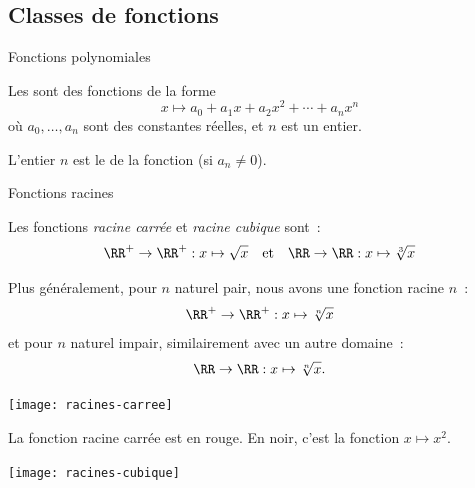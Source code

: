 \documentclass[french,xcolor=svgnames]{beamer}
\begin{document}
\subsection{Classes de fonctions}
\begin{frame}{Fonctions polynomiales}
  \begin{definition}
    Les \pause{} sont des fonctions de la forme
    \begin{equation*}
      x \mapsto a_0 + a_1 x + a_2 x^2 + \cdots + a_n x^n
    \end{equation*}\pause{}
    où $a_0, \ldots, a_n$ sont des constantes réelles\pause{}, et $n$ est un entier.\pause

    L'entier \(n\) est le  de la fonction (si $a_n \neq 0$).
  \end{definition}\pause
\end{frame}

\begin{frame}{Fonctions racines}
  \begin{example}
    Les fonctions \emph{racine carrée} et \emph{racine cubique} sont~:
    \begin{equation*}
      \RR^+ \to \RR^{+} : x \mapsto \sqrt{x} \quad \text{et} \quad  \RR \to \RR : x \mapsto \sqrt[3]{x}
    \end{equation*}
  \end{example}\pause

  \begin{example}
    Plus généralement, pour \(n\) naturel pair, nous avons une fonction racine \(n\)\ieme{}~:
    \begin{equation*}
      \RR^+ \to \RR^{+} : x \mapsto \sqrt[n]{x}
    \end{equation*}
    et pour \(n\) naturel impair, similairement avec un autre domaine~:
    \begin{equation*}
      \RR \to \RR : x \mapsto \sqrt[n]{x}.
    \end{equation*}
  \end{example}
\end{frame}

\begin{frame}
  \begin{center}
    \texttt{[image: racines-carree]}
  \end{center}\pause{}

  La fonction racine carrée est en rouge.\pause{}
  En noir, c'est la fonction $x \mapsto x^{2}$.
\end{frame}
\begin{frame}
  \begin{center}
    \texttt{[image: racines-cubique]}
  \end{center}
\end{frame}
\end{document}

